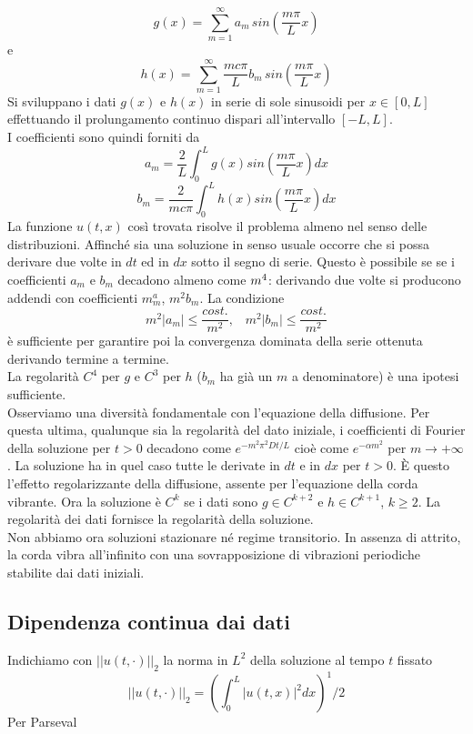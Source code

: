 \[
	g(x)= \sum_{m=1}^{\infty} a_m \, sin \left( \frac{m\pi}{L} x \right)
\]
e
\[
	h(x)= \sum_{m=1}^{\infty} \frac{mc\pi}{L} b_m \, sin \left(
	\frac{m\pi}{L} x \right)
\]
Si sviluppano i dati $g(x)$ e $h(x)$ in serie di sole sinusoidi per $x \in
[0,L]$ effettuando il prolungamento continuo dispari all'intervallo $[-L,L]$.\\
I coefficienti sono quindi forniti da
\[
	a_m= \frac{2}{L} \int_0^L g(x) sin \left( \frac{m\pi}{L} x \right) dx
\]
\[
	b_m= \frac{2}{mc \pi} \int_0^L h(x) sin \left( \frac{m\pi}{L} x \right)
dx
\]
La funzione $u(t,x)$ cos\`i trovata risolve il problema almeno nel senso delle
distribuzioni.
Affinch\'e sia una soluzione in senso usuale occorre che si possa derivare due
volte in $dt$ ed in $dx$ sotto il segno di serie.
Questo \`e possibile se se i coefficienti $a_m$ e $b_m$ decadono almeno come
$\/m^4$: derivando due volte si producono addendi con coefficienti $m^a_m$,
$m^2b_m$. La condizione
\[
	m^2|a_m|\leq \frac{cost.}{m^2}, \;\;\; m^2|b_m|\leq \frac{cost.}{m^2}
\]
\`e sufficiente per garantire poi la convergenza dominata della serie ottenuta
derivando termine a termine.\\
La regolarit\`a $C^4$ per $g$ e $C^3$ per $h$ ($b_m$ ha gi\`a un $m$ a
denominatore) \`e una ipotesi sufficiente.\\
Osserviamo una diversit\`a fondamentale con l'equazione della diffusione. Per
questa ultima, qualunque sia la regolarit\`a del dato iniziale, i coefficienti
di Fourier della soluzione per $t>0$ decadono come $e^{-m^2 \pi^2 Dt/L}$ cio\`e
come $e^{-\alpha m^2}$ per $m \to +\infty$.
La soluzione ha in quel caso tutte le derivate in $dt$ e in $dx$ per $t>0$.
\`E questo l'effetto regolarizzante della diffusione, assente per l'equazione
della corda vibrante. Ora la soluzione \`e $C^k$ se i dati sono $g \in C^{k+2}$
e $h \in C^{k+1}$, $k\geq 2$. La regolarit\`a dei dati fornisce la regolarit\`a
della soluzione.\\
Non abbiamo ora soluzioni stazionare n\'e regime transitorio. In assenza di
attrito, la corda vibra all'infinito con una sovrapposizione di vibrazioni
periodiche stabilite dai dati iniziali.
\subsection{Dipendenza continua dai dati}
Indichiamo con $||u(t, \cdot)||_2$ la norma in $L^2$ della soluzione al tempo
$t$ fissato
\[
	||u(t, \cdot)||_2=
	\left(
	\int_0^L |u(t,x)|^2 dx
	\right)^1/2
\]
Per Parseval
